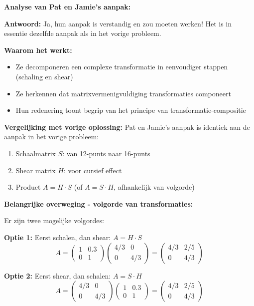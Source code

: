 \documentclass{ximera}
\begin{document}
\begin{freeResponse}
\textbf{Analyse van Pat en Jamie's aanpak:}

\textbf{Antwoord:} Ja, hun aanpak is verstandig en zou moeten werken! Het is in essentie dezelfde aanpak als in het vorige probleem.

\textbf{Waarom het werkt:}
\begin{itemize}
\item Ze decomponeren een complexe transformatie in eenvoudiger stappen (schaling en shear)
\item Ze herkennen dat matrixvermenigvuldiging transformaties componeert
\item Hun redenering toont begrip van het principe van transformatie-compositie
\end{itemize}

\textbf{Vergelijking met vorige oplossing:}
Pat en Jamie's aanpak is identiek aan de aanpak in het vorige probleem:
\begin{enumerate}
\item Schaalmatrix $S$: van 12-punts naar 16-punts
\item Shear matrix $H$: voor cursief effect
\item Product $A = H \cdot S$ (of $A = S \cdot H$, afhankelijk van volgorde)
\end{enumerate}

\textbf{Belangrijke overweging - volgorde van transformaties:}

Er zijn twee mogelijke volgordes:

\textbf{Optie 1:} Eerst schalen, dan shear: $A = H \cdot S$
$$A = \begin{pmatrix} 1 & 0.3 \\ 0 & 1 \end{pmatrix} \begin{pmatrix} 4/3 & 0 \\ 0 & 4/3 \end{pmatrix} = \begin{pmatrix} 4/3 & 2/5 \\ 0 & 4/3 \end{pmatrix}$$

\textbf{Optie 2:} Eerst shear, dan schalen: $A = S \cdot H$
$$A = \begin{pmatrix} 4/3 & 0 \\ 0 & 4/3 \end{pmatrix} \begin{pmatrix} 1 & 0.3 \\ 0 & 1 \end{pmatrix} = \begin{pmatrix} 4/3 & 2/5 \\ 0 & 4/3 \end{pmatrix}$$


\end{freeResponse}
\end{document}
